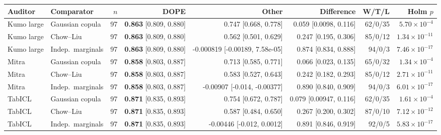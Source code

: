 \begin{tabular}{@{}llrrrrrr@{}}
\toprule
Auditor & Comparator & $n$ & DOPE & Other & Difference & W/T/L & Holm $p$ \\
\midrule
Kumo large & Gaussian copula & 97 & \textbf{0.863} [0.809, 0.880] & 0.747 [0.668, 0.778] & 0.059 [0.0098, 0.116] & 62/0/35 & $5.70\times 10^{-4}$ \\
Kumo large & Chow--Liu & 97 & \textbf{0.863} [0.809, 0.880] & 0.562 [0.501, 0.629] & 0.247 [0.195, 0.306] & 85/0/12 & $1.34\times 10^{-11}$ \\
Kumo large & Indep.\ marginals & 97 & \textbf{0.863} [0.809, 0.880] & -0.000819 [-0.00189, 7.58e-05] & 0.874 [0.834, 0.888] & 94/0/3 & $7.46\times 10^{-17}$ \\
Mitra & Gaussian copula & 97 & \textbf{0.858} [0.803, 0.887] & 0.713 [0.585, 0.771] & 0.066 [0.023, 0.135] & 65/0/32 & $1.34\times 10^{-4}$ \\
Mitra & Chow--Liu & 97 & \textbf{0.858} [0.803, 0.887] & 0.583 [0.527, 0.643] & 0.242 [0.182, 0.293] & 85/0/12 & $2.71\times 10^{-11}$ \\
Mitra & Indep.\ marginals & 97 & \textbf{0.858} [0.803, 0.887] & -0.00907 [-0.014, -0.00377] & 0.890 [0.840, 0.909] & 94/0/3 & $6.01\times 10^{-17}$ \\
TabICL & Gaussian copula & 97 & \textbf{0.871} [0.835, 0.893] & 0.754 [0.672, 0.787] & 0.079 [0.00947, 0.116] & 62/0/35 & $1.61\times 10^{-4}$ \\
TabICL & Chow--Liu & 97 & \textbf{0.871} [0.835, 0.893] & 0.587 [0.484, 0.650] & 0.267 [0.200, 0.302] & 87/0/10 & $7.12\times 10^{-12}$ \\
TabICL & Indep.\ marginals & 97 & \textbf{0.871} [0.835, 0.893] & -0.00446 [-0.012, 0.0012] & 0.891 [0.846, 0.919] & 92/0/5 & $5.83\times 10^{-17}$ \\
\bottomrule
\end{tabular}
\par{}\par
